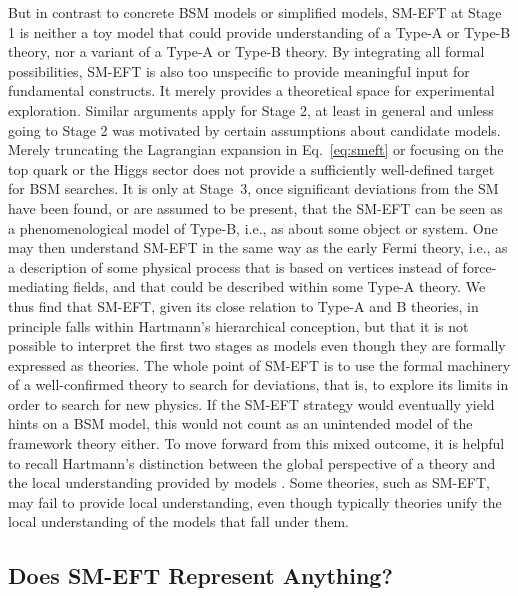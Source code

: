 But in contrast to concrete BSM models or simplified models, SM-EFT at Stage 1 is neither a toy model \citep[see][]{Reutlinger2018} that could provide understanding of a Type-A or Type-B theory, nor a variant of a Type-A or Type-B theory. 
By integrating all formal possibilities, SM-EFT is also too unspecific to provide meaningful input for fundamental constructs. 
It merely provides a theoretical space for experimental exploration.
Similar arguments apply for Stage 2, at least in general and unless going to Stage 2 was motivated by certain assumptions about candidate models.
Merely truncating the Lagrangian expansion in Eq.~\ref{eq:smeft} or focusing on the top quark or the Higgs sector does not provide a sufficiently well-defined target for BSM searches.
It is only at Stage~3, once significant deviations from the SM have been found, or are assumed to be present, that the SM-EFT can be seen as
a phenomenological model of Type-B, i.e., as about some object or system.
One may then understand SM-EFT in the same way as the early Fermi theory, i.e., as a description of some physical process that is based on vertices instead of force-mediating fields, and that could be described within some Type-A theory.
We thus find that SM-EFT, given its close relation to Type-A and B theories, in principle falls within Hartmann's hierarchical conception, but that it is not possible to interpret the first two stages as models even though they are formally expressed as theories.
The whole point of SM-EFT is to use the formal machinery of a well-confirmed theory to search for deviations, that is, to explore its limits in order to search for new physics. 
If the SM-EFT strategy would eventually yield hints on a BSM model, this would not count as an unintended model of the framework theory either.
To move forward from this mixed outcome, it is helpful to recall Hartmann's distinction between the global perspective of a theory and the local understanding provided by models \citep{hartmann2001}. 
Some theories, such as SM-EFT, may fail to provide local understanding, even though typically theories unify the local understanding of the models that fall under them.


\subsection{Does SM-EFT Represent Anything?}
\label{sub:smeftrep} 


